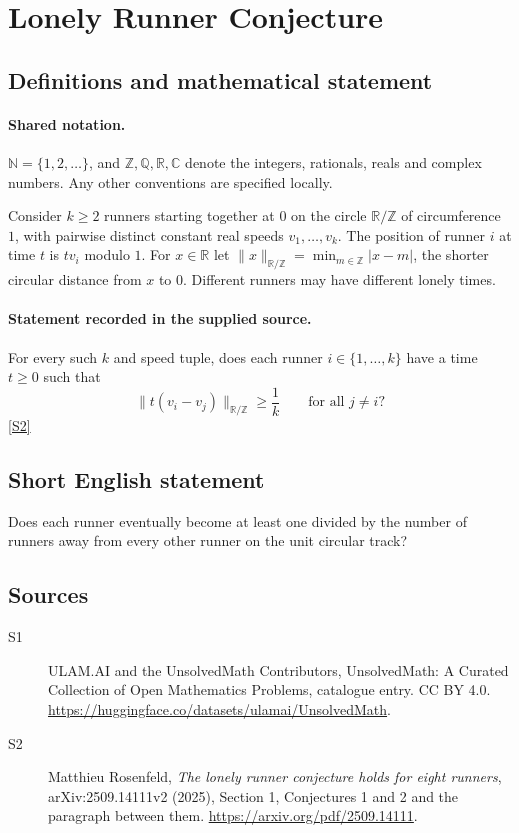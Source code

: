 \documentclass[11pt]{article}
\newcommand{\sref}[2]{\hyperlink{source:#1:#2}{[S#2]}}
\begin{document}
\section{Lonely Runner Conjecture}\label{statement}

\subsection{Definitions and mathematical statement}

\paragraph{Shared notation.}$\mathbb N=\{1,2,\ldots\}$, and $\mathbb Z,\mathbb Q,\mathbb R,\mathbb C$ denote the integers, rationals, reals and complex numbers. Any other conventions are specified locally.


Consider $k\geq2$ runners starting together at $0$ on the circle $\mathbb R/\mathbb Z$ of circumference $1$, with pairwise distinct constant real speeds $v_1,\ldots,v_k$. The position of runner $i$ at time $t$ is $tv_i$ modulo $1$. For $x\in\mathbb R$ let $\lVert x\rVert_{\mathbb R/\mathbb Z}=\min_{m\in\mathbb Z}|x-m|$, the shorter circular distance from $x$ to $0$. Different runners may have different lonely times.
\paragraph{Statement recorded in the supplied source.}
For every such $k$ and speed tuple, does each runner $i\in\{1,\ldots,k\}$ have a time $t\geq0$ such that
\[
\lVert t(v_i-v_j)\rVert_{\mathbb R/\mathbb Z}\geq\frac1k
\qquad\text{for all }j\ne i?
\] \sref{statement}{2}

\subsection{Short English statement}
Does each runner eventually become at least one divided by the number of runners away from every other runner on the unit circular track?
\subsection{Sources}
\begin{description}
\item[\hypertarget{source:statement:1}{S1}] ULAM.AI and the UnsolvedMath Contributors, UnsolvedMath: A Curated Collection of Open Mathematics Problems, catalogue entry. CC BY 4.0. \url{https://huggingface.co/datasets/ulamai/UnsolvedMath}.
\item[\hypertarget{source:statement:2}{S2}] Matthieu Rosenfeld, \emph{The lonely runner conjecture holds for eight runners}, arXiv:2509.14111v2 (2025), Section 1, Conjectures 1 and 2 and the paragraph between them. \url{https://arxiv.org/pdf/2509.14111}.
\end{description}
\label{end:statement}
\end{document}

